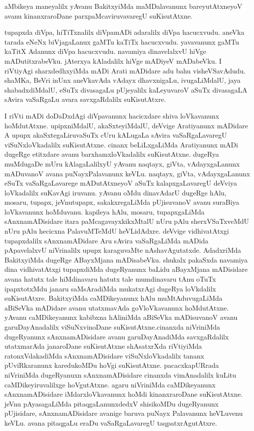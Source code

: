 \documentclass{article}
\begin{document}
\begin{mng}%
aMbikeya maneyalilx yAvanu BakitxyiMda maMDalavanunx bareyutAtxneyoV avanu kinanxraroDane 
parxpaMcaviruvavaregU suKisutAtxne.
\end{mng}

\begin{mng}%
tupapxda diVpa, hiTiTxnalilx diVpamADi adaralilx diVpa hacucxvudu. aneVka tarada eNeNx 
biVjagaLanux gaMTu kaTiTx hacucxvudu. yavavanunx gaMTu kaTitX Adanunx diVpa hacucxvudu. navamiya 
dinavelalxvU hiVge mADutitxrabeVku. jAterxya kAladalilx hiVge mADiyeV mADabeVku. I riVtiyAgi 
sharxdedhxyiMda mADi Arati mADidare adu bahu visheVSavAdudu. shaMKa, BeVri inUnx aneVkavAda 
vAdayx dhavxnigaLu, ivugaLiMdalU, jaya shabadxdiMdalU, eSuTx divasagaLu pUjeyalilx kaLeyuvaroV 
aSuTx divasagaLA sAvira vaSaRgaLu avara savxgaRdalilx suKisutAtxre.
\end{mng}

\begin{mng}%
I riVti mADi doDaDxdAgi diVpavanunx hacicxdare shiva loVkavanunx hoMdutAtxne. upipxniMdalU, 
akaSxteyiMdalU, deVvige Aratiyanunx mADidare A upupx akaSxtegaLiruvaSuTx cUru kALugaLa sAvira 
vaSaRgaLavaregU viSuNxloVkadalilx suKisutAtxne. cinanx beLiLxgaLiMda Aratiyanunx mADi dugeRge 
etitxdare avanu barxhamxloVkadalilx suKisutAtxne. dugeRya muMdugaDe mUru kAlagaLalilxyU yAvanu 
naqtayx, giVta, vAdayxgaLanunx mADuvanoV avana puNayxPalavanunx keVLu. naqtayx, giVta, 
vAdayxgaLanunx eSuTx vaSaRgaLavarege mADutAtxneyoV aSuTx kalapxgaLavaregU deVviya loVkadalilx 
suKavAgi iruvanu. yAvanu oMdu dinavAdarU dugeRge hAlu, mosaru, tupapx, jeVnutupapx, 
sakakxregaLiMda pUjisuvanoV avanu suraBiya loVkavanunx hoMduvanu. kapileya hAlu, mosaru, 
tupapxgaLiMda sAnxnamADisidare itara paMcagavayxkikxMtalU nUru pAlu sherxVSaTxveMdU nUru pAlu 
hecicxna PalavuMTeMdU heVLidAdxre. deVvige vidhivatAtxgi tupapxdalilx sAnxnamADidare Aru sAvira 
vaSaRgaLiMda mADida pApavelalxvU niVrinalilx upupx karaguvaMte nAshavAgutatxde. AdadxriMda 
BakitxyiMda dugeRge ABayxMjana mADisabeVku. shukalx pakaSxda navamiya dina vidhivatAtxgi 
tupapxdiMda dugeRyanunx baLidu aBayxMjana mADisidare avana hatutx tale hiMdinavaru hatutx tale 
mumdinavaru tAnu oTuTx ipapxtotxMdu janaru saMsAradiMda mukatxrAgi dugeRya loVkdalilx 
suKisutAtxre. BakitxyiMda caMDikeyanunx hAlu muMtAduvugaLiMda aBiSeVka mADidare avanu utatxmavAda 
goVloVkavanunx hoMdutAtxne. yAvanu caMDikeyanunx kabibxna hAliniMda aBiSeVka mADisuvanoV avanu 
garuDayAnadalilx viSuNxvinoDane suKisutAtxne.cinanxda niVriniMda dugeRyanunx sAnxnamADisidare 
avanu garuDayAnadiMda savxgaRdalilx utatxmarAda janaroDane suKisutAtxne shAsatxrXda riVtiyiMda 
ratonxVdakadiMda sAnxnamADisidare viSuNxloVkadalilx tananx pUviRkaranunx karedukoMDu hoVgi 
suKisutAtxne. pacacxkapURrada niVriniMda dugeRyanuxn sAnxnamADisidare cinanxda vimAnadalilx 
kuLitu caMDikeyiruvalilxge hoVgutAtxne. agaru niVriniMda caMDikeyanunx sAnxnamADisidare 
iMdarxloVkavanunx hoMdi kinanxraroDane suKisutAtxne. jeVnu pAyasagaLiMda pitaqgaLanunxdedxV 
shisikoMDu dugeRyanunx pUjisidare, sAnxnamADisidare avanige baruva puNayx Palavanunx heVLuvenu 
keVLu. avana pitaqgaLu eraDu vaSaRgaLavaregU taqpatxrAgutAtxre.
\end{mng}
\end{document}
